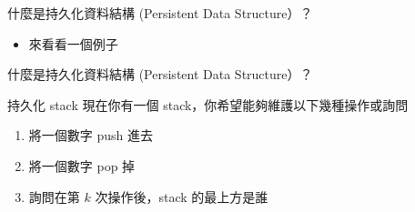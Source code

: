 \documentclass[aspectratio=169]{beamer}
\begin{document}
    \begin{frame}{什麼是持久化資料結構 (Persistent Data Structure）？}
        \begin{itemize}
            \item 來看看一個例子
        \end{itemize}
    \end{frame}

    \begin{frame}{什麼是持久化資料結構 (Persistent Data Structure）？}
        \begin{block}{持久化 stack}
            現在你有一個 stack，你希望能夠維護以下幾種操作或詢問
            \begin{enumerate}
                \item 將一個數字 push 進去
                \item 將一個數字 pop 掉
                \item 詢問在第 $k$ 次操作後，stack 的最上方是誰
            \end{enumerate}
        \end{block}
    \end{frame}
\end{document}
